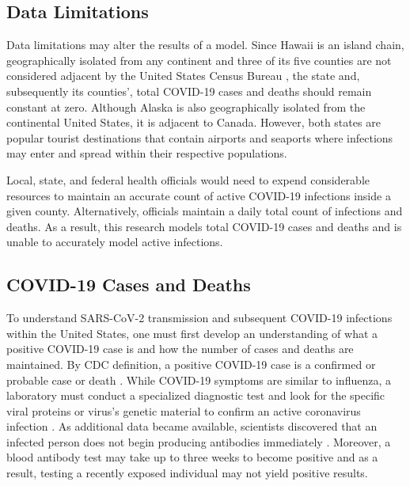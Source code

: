 \subsection{Data Limitations}
Data limitations may alter the results of a model.  Since Hawaii is an island chain, geographically isolated from any continent and three of its five counties are not considered adjacent by the United States Census Bureau \cite{USCBAdjacency}, the state and, subsequently its counties', total {COVID-19} cases and deaths should remain constant at zero.  Although Alaska is also geographically isolated from the continental United States, it is adjacent to Canada.  However, both states are popular tourist destinations that contain airports and seaports where infections may enter and spread within their respective populations. 

Local, state, and federal health officials would need to expend considerable resources to maintain an accurate count of active {COVID-19} infections inside a given county.  Alternatively, officials maintain a daily total count of infections and deaths.  As a result, this research models total {COVID-19} cases and deaths and is unable to accurately model active infections.

\subsection{{COVID-19} Cases and Deaths}\label{subsectioncovidcases}
To understand {SARS-CoV-2} transmission and subsequent {COVID-19} infections within the United States, one must first develop an understanding of what a positive {COVID-19} case is and how the number of cases and deaths are maintained.  By {CDC} definition, a positive {COVID-19} case is a confirmed or probable case or death \cite{CDCFAQ}.  While {COVID-19} symptoms are similar to influenza, a laboratory must conduct a specialized diagnostic test and look for the specific viral proteins or virus's genetic material to confirm an active coronavirus infection \cite{Harvard}.  As additional data became available, scientists discovered that an infected person does not begin producing antibodies immediately \cite{Harvard}.  Moreover, a blood antibody test may take up to three weeks to become positive and as a result, testing a recently exposed individual may not yield positive results. 

